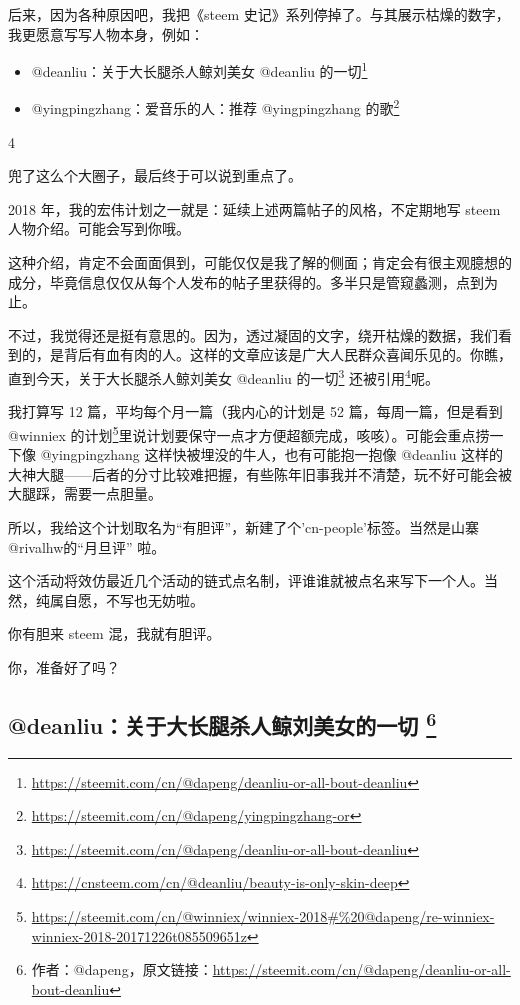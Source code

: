 \documentclass[]{ctexbook}
\providecommand{\tightlist}{%
  \setlength{\itemsep}{0pt}\setlength{\parskip}{0pt}}
\renewcommand{\href}[2]{#2\footnote{\url{#1}}}
\begin{document}
后来，因为各种原因吧，我把《steem 史记》系列停掉了。与其展示枯燥的数字，我更愿意写写人物本身，例如：

\begin{itemize}
\tightlist
\item
  @deanliu：\href{https://steemit.com/cn/@dapeng/deanliu-or-all-bout-deanliu}{关于大长腿杀人鲸刘美女 @deanliu 的一切}
\item
  @yingpingzhang：\href{https://steemit.com/cn/@dapeng/yingpingzhang-or}{爱音乐的人：推荐 @yingpingzhang 的歌}
\end{itemize}

4

兜了这么个大圈子，最后终于可以说到重点了。

2018 年，我的宏伟计划之一就是：延续上述两篇帖子的风格，不定期地写 steem 人物介绍。可能会写到你哦。

这种介绍，肯定不会面面俱到，可能仅仅是我了解的侧面；肯定会有很主观臆想的成分，毕竟信息仅仅从每个人发布的帖子里获得的。多半只是管窥蠡测，点到为止。

不过，我觉得还是挺有意思的。因为，透过凝固的文字，绕开枯燥的数据，我们看到的，是背后有血有肉的人。这样的文章应该是广大人民群众喜闻乐见的。你瞧，直到今天，\href{https://steemit.com/cn/@dapeng/deanliu-or-all-bout-deanliu}{关于大长腿杀人鲸刘美女 @deanliu 的一切} 还\href{https://cnsteem.com/cn/@deanliu/beauty-is-only-skin-deep}{被引用}呢。

我打算写 12 篇，平均每个月一篇（我内心的计划是 52 篇，每周一篇，但是看到 \href{https://steemit.com/cn/@winniex/winniex-2018\#\%20@dapeng/re-winniex-winniex-2018-20171226t085509651z}{@winniex 的计划}里说计划要保守一点才方便超额完成，咳咳）。可能会重点捞一下像 @yingpingzhang 这样快被埋没的牛人，也有可能抱一抱像 @deanliu 这样的大神大腿------后者的分寸比较难把握，有些陈年旧事我并不清楚，玩不好可能会被大腿踩，需要一点胆量。

所以，我给这个计划取名为``有胆评''，新建了个'cn-people'标签。当然是山寨 @rivalhw的``月旦评'' 啦。

这个活动将效仿最近几个活动的链式点名制，评谁谁就被点名来写下一个人。当然，纯属自愿，不写也无妨啦。

你有胆来 steem 混，我就有胆评。

你，准备好了吗？

\hypertarget{deanliu}{%
\subsection[@deanliu：关于大长腿杀人鲸刘美女的一切 ]{\texorpdfstring{@deanliu：关于大长腿杀人鲸刘美女的一切 \footnote{作者：@dapeng，原文链接：\url{https://steemit.com/cn/@dapeng/deanliu-or-all-bout-deanliu}}}{@deanliu：关于大长腿杀人鲸刘美女的一切 }}\label{deanliu}}
\end{document}
